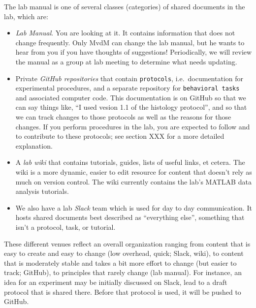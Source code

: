 \documentclass{tufte-book}
\newcommand{\doccls}[1]{\texttt{#1}}%
\begin{document}
The lab manual is one of several classes (categories) of shared
documents in the lab, which are:

\begin{itemize}
\item{{\it Lab Manual}. You are looking at it. It contains information
  that does not change frequently. Only MvdM can change the lab
  manual, but he wants to hear from you if you have thoughts of
  suggestions! Periodically, we will review the manual as a group at
  lab meeting to determine what needs updating.}
\item{Private {\it GitHub
    repositories} that contain \doccls{protocols},
  i.e.\ documentation for experimental procedures, and a separate repository for
  \doccls{behavioral tasks} and associated computer
  code. This documentation is on GitHub
  so that we can say things like, ``I used vesion 1.1 of the histology
  protocol'', and so that we can track changes to those protocols as
  well as the reasons for those changes. If you perform procedures in
  the lab, you are expected to follow and to contribute to these
  protocols; see section XXX for a more detailed explanation.}
\item{A {\it lab
    wiki} that
  contains tutorials, guides, lists of useful links, et cetera. The
  wiki is a more dynamic, easier to edit resource for content that
  doesn't rely as much on version control. The wiki currently contains
  the lab's MATLAB data analysis tutorials.}
\item{We also have a lab {\it Slack}
  team which is used for day to day
  communication. It hosts shared documents best described as
  ``everything else'', something that isn't a protocol, task, or
  tutorial.}
\end{itemize}

These different venues reflect an overall organization ranging from
content that is easy to create and easy to change (low overhead,
quick; Slack, wiki), to content that is moderately stable and takes a
bit more effort to change (but easier to track; GitHub), to principles
that rarely change (lab manual). For instance, an idea for an
experiment may be initially discussed on Slack, lead to a draft
protocol that is shared there. Before that protocol is used, it will
be pushed to GitHub. 
\end{document}
